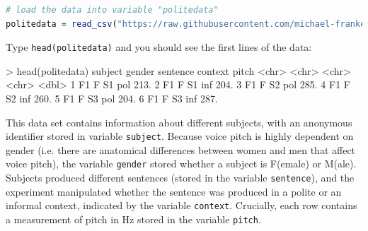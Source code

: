 \documentclass[nobib]{tufte-handout}
\newcommand{\ri}[1]{\lstinline{#1}}  %
\begin{document}
\begin{minipage}[]{\textwidth}
\begin{lstlisting}[language=R]
# load the data into variable "politedata"
politedata = read_csv("https://raw.githubusercontent.com/michael-franke/bayes_mixed_regression_tutorial/master/code/politeness_data.csv")
\end{lstlisting}
\end{minipage}

\vspace*{-0.5cm}

\noindent Type \ri{head(politedata)} and you should see the first lines of the
data:
%

\bigskip

\begin{minipage}[]{\textwidth}
\begin{rc}
> head(politedata)
   subject gender sentence context pitch
   <chr>   <chr>  <chr>    <chr>   <dbl>
 1 F1      F      S1       pol      213.
 2 F1      F      S1       inf      204.
 3 F1      F      S2       pol      285.
 4 F1      F      S2       inf      260.
 5 F1      F      S3       pol      204.
 6 F1      F      S3       inf      287.
\end{rc}
\end{minipage}


\medskip

\noindent This data set contains information about different subjects, with an anonymous identifier stored in variable \texttt{subject}.
Because voice pitch is highly dependent on gender (i.e. there are anatomical differences between women and men that affect voice pitch), the variable \texttt{gender} stored whether a subject is F(emale) or M(ale).
Subjects produced different sentences (stored in the variable \texttt{sentence}), and the experiment manipulated whether the sentence was produced in a polite or an informal context, indicated by the variable \texttt{context}. Crucially, each row contains a measurement of pitch in Hz stored in the variable \texttt{pitch}.
\end{document}
